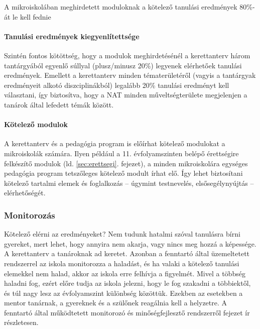 A mikroiskolában meghirdetett moduloknak a kötelező tanulási eredmények 80\%-át
le kell fednie

\paragraph{Tanulási eredmények kiegyenlítettsége}

Szintén fontos kötöttség, hogy a modulok meghirdetésénél a kerettanterv
három tantárgyából egyenlő súllyal (plusz/minusz 20\%) legyenek
elérhetőek tanulási eredmények. Emellett a kerettanterv minden
tématerületéről (vagyis a tantárgyak eredményeit alkotó diszciplinákból)
legalább 20\% tanulási eredményt kell választani, így biztosítva, hogy a
NAT minden műveltségterülete megjelenjen a tanárok által lefedett témák
között.

\paragraph{Kötelező modulok}
A kerettanterv és a pedagógia program is előírhat kötelező modulokat
a mikroiskolák számára. Ilyen például a 11. évfolyamszinten belépő érettségire
felkészítő modulok (ld. \ref{sec:erettsegi}. fejezet), a minden mikroiskolára
egységes
pedagógia program tetszőleges kötelező modult írhat elő. Így lehet biztosítani
kötelező
tartalmi elemek és foglalkozás -- úgymint testnevelés, elsősegélynyújtás --
elérhetőségét.

\subsubsection{Monitorozás}

Kötelező elérni az eredményeket? Nem tudunk hatalmi szóval tanulásra
bírni gyereket, mert lehet, hogy annyira nem akarja, vagy nincs meg
hozzá a képessége. A kerettanterv a tanároknak ad keretet. Azonban a
fenntartó által üzemeltetett rendszerrel az iskola  monitorozza a
haladást, és ha valaki a kötelező tanulási elemekkel nem halad, akkor
az iskola erre felhívja a figyelmét. Mivel a többség haladni fog, ezért előre
tudja az iskola jelezni,
hogy le fog szakadni a többiektől, és túl nagy lesz az évfolyamszint
különbség közöttük. Ezekben az esetekben a mentor tanárnak, a
gyereknek és a szülőnek reagálnia kell a helyzetre. A fenntartó által működtetett monitorozó
és minőségfejlesztő rendszerről  fejezet ír
részletesen.